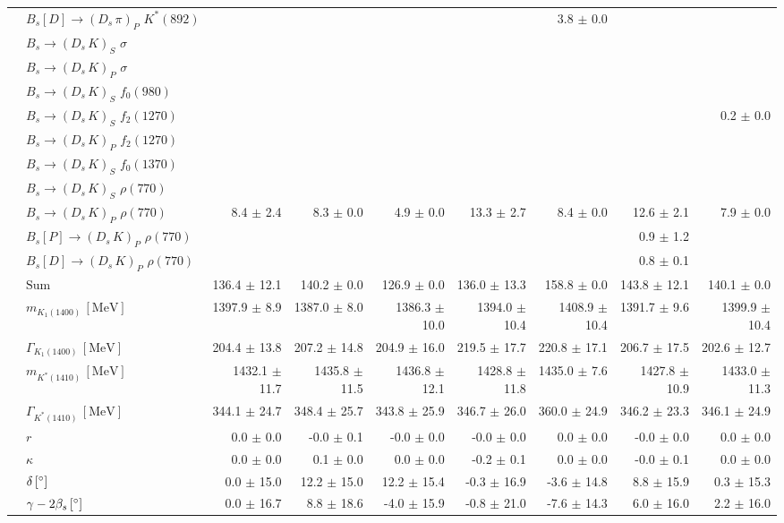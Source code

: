 \begin{tabular}{l l  r  r  r  r  r  r  r  }
 & $B_s[D] \to ( D_s \, \pi)_{P} \, \, K^{*}(892)$ &  &  &  &  & 3.8 $\pm$ 0.0 &  &  \\ 
 & $B_s \to ( D_s \, K)_{S} \, \, \sigma$ &  &  &  &  &  &  &  \\ 
 & $B_s \to ( D_s \, K)_{P} \, \, \sigma$ &  &  &  &  &  &  &  \\ 
 & $B_s \to ( D_s \, K)_{S} \, \, f_0(980)$ &  &  &  &  &  &  &  \\ 
 & $B_s \to ( D_s \, K)_{S} \, \, f_2(1270)$ &  &  &  &  &  &  & 0.2 $\pm$ 0.0 \\ 
 & $B_s \to ( D_s \, K)_{P} \, \, f_2(1270)$ &  &  &  &  &  &  &  \\ 
 & $B_s \to ( D_s \, K)_{S} \, \, f_0(1370)$ &  &  &  &  &  &  &  \\ 
 & $B_s \to ( D_s \, K)_{S} \, \, \rho(770)$ &  &  &  &  &  &  &  \\ 
 & $B_s \to ( D_s \, K)_{P} \, \, \rho(770)$ & 8.4 $\pm$ 2.4 & 8.3 $\pm$ 0.0 & 4.9 $\pm$ 0.0 & 13.3 $\pm$ 2.7 & 8.4 $\pm$ 0.0 & 12.6 $\pm$ 2.1 & 7.9 $\pm$ 0.0 \\ 
 & $B_s[P] \to ( D_s \, K)_{P} \, \, \rho(770)$ &  &  &  &  &  & 0.9 $\pm$ 1.2 &  \\ 
 & $B_s[D] \to ( D_s \, K)_{P} \, \, \rho(770)$ &  &  &  &  &  & 0.8 $\pm$ 0.1 &  \\ 
 & $\text{Sum}$ & 136.4 $\pm$ 12.1 & 140.2 $\pm$ 0.0 & 126.9 $\pm$ 0.0 & 136.0 $\pm$ 13.3 & 158.8 $\pm$ 0.0 & 143.8 $\pm$ 12.1 & 140.1 $\pm$ 0.0 \\ 
\hline
 & $m_{K_1(1400)} \, [\text{MeV}]$ & 1397.9 $\pm$ 8.9 & 1387.0 $\pm$ 8.0 & 1386.3 $\pm$ 10.0 & 1394.0 $\pm$ 10.4 & 1408.9 $\pm$ 10.4 & 1391.7 $\pm$ 9.6 & 1399.9 $\pm$ 10.4 \\ 
 & $\Gamma_{K_1(1400)} \, [\text{MeV}]$ & 204.4 $\pm$ 13.8 & 207.2 $\pm$ 14.8 & 204.9 $\pm$ 16.0 & 219.5 $\pm$ 17.7 & 220.8 $\pm$ 17.1 & 206.7 $\pm$ 17.5 & 202.6 $\pm$ 12.7 \\ 
 & $m_{K^{*}(1410)} \, [\text{MeV}]$ & 1432.1 $\pm$ 11.7 & 1435.8 $\pm$ 11.5 & 1436.8 $\pm$ 12.1 & 1428.8 $\pm$ 11.8 & 1435.0 $\pm$ 7.6 & 1427.8 $\pm$ 10.9 & 1433.0 $\pm$ 11.3 \\ 
 & $\Gamma_{K^{*}(1410)} \, [\text{MeV}]$ & 344.1 $\pm$ 24.7 & 348.4 $\pm$ 25.7 & 343.8 $\pm$ 25.9 & 346.7 $\pm$ 26.0 & 360.0 $\pm$ 24.9 & 346.2 $\pm$ 23.3 & 346.1 $\pm$ 24.9 \\ 
 & $r$ & 0.0 $\pm$ 0.0 & -0.0 $\pm$ 0.1 & -0.0 $\pm$ 0.0 & -0.0 $\pm$ 0.0 & 0.0 $\pm$ 0.0 & -0.0 $\pm$ 0.0 & 0.0 $\pm$ 0.0 \\ 
 & $\kappa$ & 0.0 $\pm$ 0.0 & 0.1 $\pm$ 0.0 & 0.0 $\pm$ 0.0 & -0.2 $\pm$ 0.1 & 0.0 $\pm$ 0.0 & -0.0 $\pm$ 0.1 & 0.0 $\pm$ 0.0 \\ 
 & $\delta \, [^{\circ}]$ & 0.0 $\pm$ 15.0 & 12.2 $\pm$ 15.0 & 12.2 $\pm$ 15.4 & -0.3 $\pm$ 16.9 & -3.6 $\pm$ 14.8 & 8.8 $\pm$ 15.9 & 0.3 $\pm$ 15.3 \\ 
 & $\gamma - 2 \beta_{s} \, [^{\circ}]$ & 0.0 $\pm$ 16.7 & 8.8 $\pm$ 18.6 & -4.0 $\pm$ 15.9 & -0.8 $\pm$ 21.0 & -7.6 $\pm$ 14.3 & 6.0 $\pm$ 16.0 & 2.2 $\pm$ 16.0 \\ 
\hline
\hline
\end{tabular}

